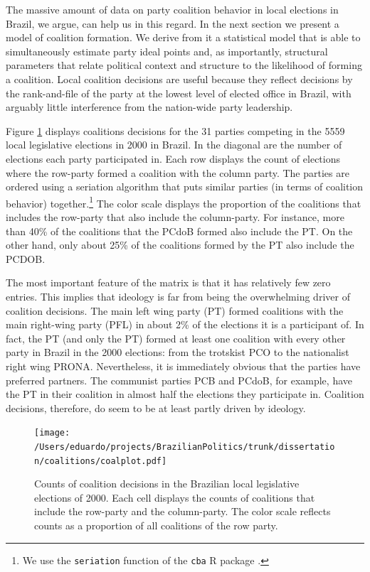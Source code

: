 The massive amount of data on party coalition behavior in local elections in Brazil, we argue, can  help us in this regard. In the next section we present a model of coalition formation. We   derive from it  a statistical model that is able to simultaneously estimate party ideal points and, as importantly, structural parameters that relate political context and structure to the likelihood of forming a coalition. Local coalition decisions are useful because  they reflect decisions by the rank-and-file of the party at  the lowest level of elected office in Brazil,  with arguably little interference from the nation-wide party leadership.

Figure \ref{fig:coalplot}  displays coalitions decisions for the 31 parties competing in the 5559 local legislative elections in 2000 in Brazil. In the diagonal are the number of elections each party participated in. Each row displays the count of elections where the row-party formed a coalition with the column party. The parties are ordered  using a seriation algorithm that puts similar parties (in terms of coalition behavior) together.\footnote{We use the \texttt{seriation} function of the \texttt{cba} R package \cite{buchta:2006}.} The color scale displays the proportion of the coalitions that includes the row-party that also include the column-party. For instance, more than 40\% of the coalitions that the PCdoB formed also include the PT. On the other hand, only about 25\% of  the coalitions formed by the PT also include the PCDOB.


The most important feature of the matrix is that it has relatively few zero entries. This  implies that ideology is far from being the overwhelming driver of coalition decisions. The main left wing party (PT)  formed coalitions with the main right-wing party (PFL) in about 2\% of the elections it is a participant of. In fact, the PT (and only the PT)  formed at least one coalition with every other party in Brazil in the 2000 elections: from the trotskist  PCO  to the nationalist right wing PRONA. Nevertheless, it is immediately obvious that the parties have preferred partners. The communist parties PCB and PCdoB, for example, have the PT in their coalition in almost half the elections they participate in.  Coalition decisions, therefore, do seem to be  at least partly  driven by ideology. 
   
\begin{landscape}
\begin{figure}
  \centering
  \texttt{[image: /Users/eduardo/projects/BrazilianPolitics/trunk/dissertation/coalitions/coalplot.pdf]}
  \caption{Counts of coalition decisions in the Brazilian local legislative elections of 2000. Each cell  displays the counts of  coalitions that include the row-party and the column-party. The color scale reflects counts as a  proportion of all coalitions of the row party.}
  \label{fig:coalplot}
\end{figure}
\end{landscape}


